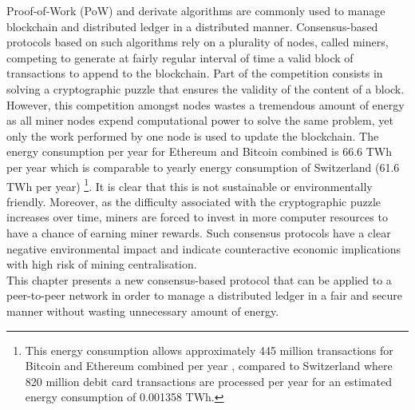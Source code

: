 Proof-of-Work (PoW) and derivate algorithms are commonly used to manage blockchain and distributed ledger in a distributed manner. Consensus-based protocols based on such algorithms rely on a plurality of nodes, called miners, competing to generate at fairly regular interval of time a valid block of transactions to append to the blockchain. Part of the competition consists in solving a cryptographic puzzle that ensures the validity of the content of a block. \\

However, this competition amongst nodes wastes a tremendous amount of energy as all miner nodes expend computational power to solve the same problem, yet only the work performed by one node is used to update the blockchain. The energy consumption per year for Ethereum and Bitcoin combined is 66.6 TWh per year which is comparable to yearly energy consumption of Switzerland (61.6 TWh per year) \cite{electric}\footnote{This energy consumption allows approximately 445 million transactions for Bitcoin and Ethereum combined per year \cite{BitTxpD}\cite{EthTxpD}, compared to Switzerland where 820 million debit card transactions are processed per year \cite{swis} for an estimated energy consumption of 0.001358 TWh.}. It is clear that this is not sustainable or environmentally friendly. Moreover, as the difficulty associated with the cryptographic puzzle increases over time, miners are forced to invest in more computer resources to have a chance of earning miner rewards. Such consensus protocols have a clear negative environmental impact and indicate counteractive economic implications with high risk of mining centralisation. \\

This chapter presents a new consensus-based protocol that can be applied to a peer-to-peer network in order to manage a distributed ledger in a fair and secure manner without wasting unnecessary amount of energy. 